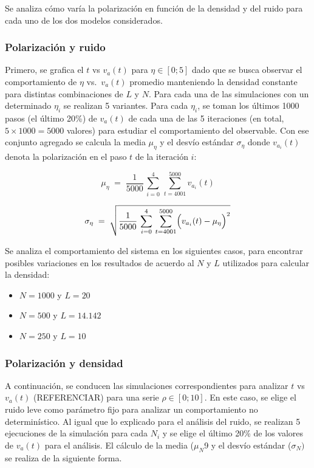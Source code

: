 \documentclass{article}
\begin{document}
Se analiza cómo varía la polarización en función de la densidad y del ruido para cada uno de los dos modelos considerados. 

\subsubsection{Polarización y ruido}
Primero, se grafica el \(t\) vs \(v_a(t)\) para \(\eta \in [0;5]\) dado que se busca observar el comportamiento de \( \eta \) vs.\ \( v_a(t) \) promedio manteniendo la densidad constante para distintas combinaciones de \( L \) y \( N \).  Para cada una de las simulaciones con un determinado \(\eta_i\) se realizan 5 variantes. Para cada \(\eta_i\), se toman los últimos 1000 pasos (el último 20\%) de \(v_a(t)\) de cada una de las 5 iteraciones (en total, \(5\times 1000=5000\) valores) para estudiar el comportamiento del observable. Con ese conjunto agregado se calcula la media \(\mu_\eta\) y el desvío estándar \(\sigma_\eta\) donde \(v_{a_i}(t)\) denota la polarización en el paso \(t\) de la iteración \(i\):

\[
\mu_{\eta} \;=\; \frac{1}{5000}\,\sum_{i=0}^{4}\,\sum_{t=4001}^{5000} v_{a_i}(t)
\]

\[
\sigma_{\eta} \;=\; \sqrt{\frac{1}{5000}\,\sum_{i=0}^{4}\,\sum_{t=4001}^{5000}\Bigl(v_{a_i}(t)-\mu_{\eta}\Bigr)^2}
\]


Se analiza el comportamiento del sistema en los siguientes casos, para encontrar posibles variaciones en los resultados de acuerdo al \(N\) y \(L\) utilizados para calcular la densidad:
\begin{itemize}
    \item \(N=1000\) y \(L=20\) 
    \item \(N=500\) y \(L=14.142\)
    \item \(N=250\) y \(L=10\)
\end{itemize}

\subsubsection{Polarización y densidad}
A continuación, se conducen las simulaciones correspondientes para analizar   \(t\) vs \(v_a(t)\) (REFERENCIAR) para una serie  \(\rho\in [0;10]\). En este caso, se elige el ruido leve como parámetro fijo para analizar un comportamiento no determinístico.
Al igual que lo explicado para el análisis del ruido, se realizan 5 ejecuciones de la simulación para cada \(N_i\) y se elige el último 20\% de los valores de \(v_a(t)\) para el análisis. El cálculo de la media (\(\mu_N\)9 y el desvío estándar (\(\sigma_N)\) se realiza de la siguiente forma.
\end{document}

